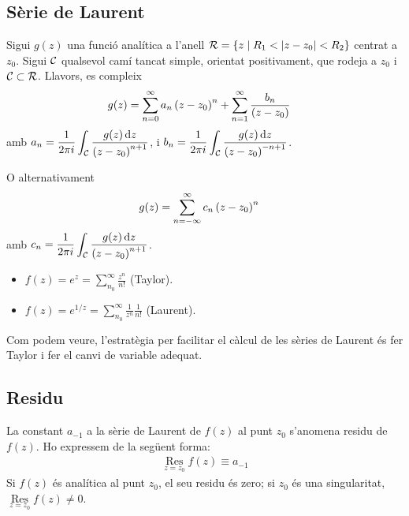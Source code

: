 \subsection{Sèrie de Laurent}
\begin{thm}[de Laurent]
	Sigui $g(z)$ una funció analítica a l'anell $\mathcal{R} = \left\{ z \mid R_{1} < \left| z - z_{0} \right| < R_{2} \right\}$ centrat a $z_{0}$. Sigui $\mathcal{C}$ qualsevol camí tancat simple, orientat positivament, que rodeja a $z_{0}$ i $\mathcal{C} \subset \mathcal{R}$. Llavors, es compleix
	\begin{align}
		g(z) &= \sum_{n=0}^{\infty} a_{n} \left( z-z_{0} \right)^{n} + \sum_{n=1}^{\infty} \frac{b_{n}}{\left( z - z_{0} \right)}
	\end{align}
	amb $a_{n} = \dfrac{1}{2 \pi i} \displaystyle \int_{\mathcal{C}} \frac{g(z) \mathop{}\!\mathrm{d} z}{\left( z-z_{0} \right)^{n+1}}$, i $b_{n} = \dfrac{1}{2 \pi i} \displaystyle \int_{\mathcal{C}} \frac{g(z) \mathop{}\!\mathrm{d} z}{\left( z-z_{0} \right)^{-n+1}}$.

	O alternativament
	\begin{align}
		g(z) &= \sum_{n = -\infty}^{\infty} c_{n} \left( z-z_{0} \right)^{n}
	\end{align}
	amb $c_{n} = \dfrac{1}{2\pi i} \displaystyle \int_{\mathcal{C}} \frac{g(z) \mathop{}\!\mathrm{d} z}{\left( z-z_{0} \right)^{n+1}}$.
\end{thm}

\begin{example}
    \begin{itemize}
        \item $\displaystyle f(z) = e^{z} = \sum_{n_{0}}^{\infty} \frac{z^{n}}{n!}$ (Taylor).
        \item $\displaystyle f(z) = e^{1/z} = \sum_{n_{0}}^{\infty} \frac{1}{z^{n}}\frac{1}{n!}$ (Laurent).
    \end{itemize}
    Com podem veure, l'estratègia per facilitar el càlcul de les sèries de Laurent és fer Taylor i fer el canvi de variable adequat.
\end{example}

\subsection{Residu}
\begin{defi}[Residu]
	La constant $a_{-1}$ a la sèrie de Laurent de $f(z)$ al punt $z_{0}$ s'anomena residu de $f(z)$. Ho expressem de la següent forma:
	\begin{align}
	    \underset{z=z_{0}}{\operatorname{Res}} f(z) \equiv a_{-1}
    \end{align}
	Si $f(z)$ és analítica al punt $z_{0}$, el seu residu és zero; si $z_{0}$ és una singularitat, $\underset{z=z_{0}}{\operatorname{Res}} f(z) \neq 0$.
\end{defi}

